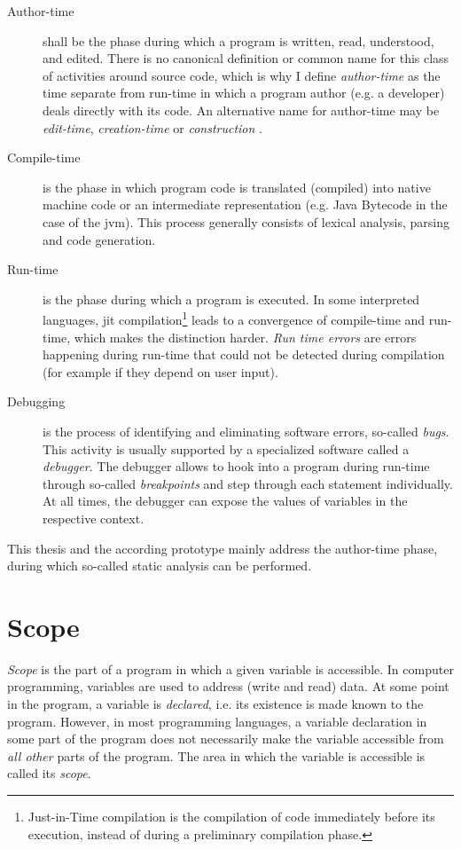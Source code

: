 \begin{description}
\item[Author-time]
shall be the phase during which a program is written, read, understood,
and edited. There is no canonical definition or common name for this
class of activities around source code, which is why I define
\emph{author-time} as the time separate from run-time in which a program
author (e.g. a developer) deals directly with its code. An alternative
name for author-time may be \emph{edit-time}, \emph{creation-time}
\cite{getify} or \emph{construction} \cite{mcconnell}.
\item[Compile-time]
is the phase in which program code is translated (compiled) into native
machine code or an intermediate representation (e.g. Java Bytecode in
the case of the \ac{jvm}). This process generally consists of lexical
analysis, parsing and code generation.
\item[Run-time]
is the phase during which a program is executed. In some interpreted
languages, \ac{jit} compilation\footnote{Just-in-Time compilation is the
  compilation of code immediately before its execution, instead of
  during a preliminary compilation phase.} leads to a convergence of
compile-time and run-time, which makes the distinction harder. \emph{Run
time errors} are errors happening during run-time that could not be
detected during compilation (for example if they depend on user input).
\item[Debugging]
is the process of identifying and eliminating software errors, so-called
\emph{bugs}. This activity is usually supported by a specialized
software called a \emph{debugger}. The debugger allows to hook into a
program during run-time through so-called \emph{breakpoints} and step
through each statement individually. At all times, the debugger can
expose the values of variables in the respective context.
\end{description}

This thesis and the according prototype mainly address the author-time
phase, during which so-called static analysis can be performed.

\section{Scope}\label{scope}

\emph{Scope} is the part of a program in which a given variable is
accessible. In computer programming, variables are used to address
(write and read) data. At some point in the program, a variable is
\emph{declared}, i.e. its existence is made known to the program.
However, in most programming languages, a variable declaration in some
part of the program does not necessarily make the variable accessible
from \emph{all other} parts of the program. The area in which the
variable is accessible is called its \emph{scope}.

